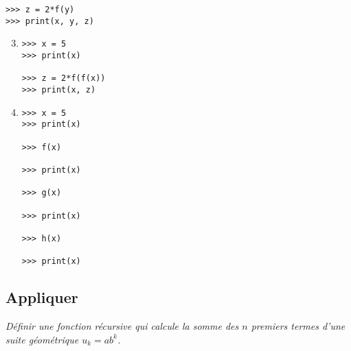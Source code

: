 \begin{td}
\begin{minipage}[t]{4cm}
\begin{enumerate}
\begin{py}{4cm}
\begin{verbatim}
>>> z = 2*f(y)
>>> print(x, y, z)

\end{verbatim}
\end{py}
\end{enumerate}
\end{minipage}
\hfill
\begin{minipage}[t]{4cm}
\begin{enumerate}\setcounter{enumi}{2}
\item 

\begin{py}{4cm}
\begin{verbatim}
>>> x = 5
>>> print(x)

>>> z = 2*f(f(x))
>>> print(x, z)

\end{verbatim}
\end{py}
\end{enumerate}
\end{minipage}
\hfill
\begin{minipage}[t]{4cm}
\begin{enumerate}\setcounter{enumi}{3}
\item 

\begin{py}{4cm}
\begin{verbatim}
>>> x = 5
>>> print(x)

>>> f(x)

>>> print(x)

>>> g(x)

>>> print(x)

>>> h(x)

>>> print(x)

\end{verbatim}
\end{py}


\end{enumerate}
\end{minipage}
\end{td}


\subsection{Appliquer}
\begin{td}\label{td:geometrie}
\em
Définir une fonction récursive qui calcule la somme des $n$ premiers termes 
d'une suite géométrique $u_k = ab^k$.
\end{td}

